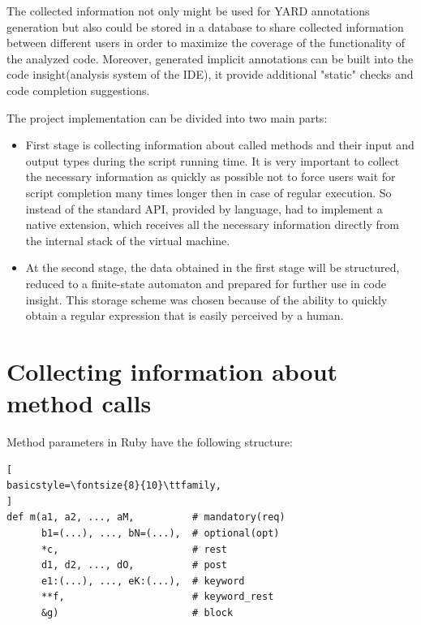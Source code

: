\documentclass[conference]{IEEEtran}
\begin{document}
The collected information not only might be used for YARD annotations generation but also could be stored in a database
to share collected information between different users in order to maximize the coverage of the functionality of the analyzed code. Moreover, generated implicit annotations can be built into the code insight(analysis system of the IDE\cite{Control_flow_analysis_in_scheme}), it provide additional "static" checks and code completion suggestions.

    The project implementation can be divided into two main parts:
    \begin{itemize}  
    \item First stage is collecting information about called methods and their input and output types during the script running time. It is very important to collect the necessary information as quickly as possible not to force users wait for script completion many times longer then in case of regular execution. So instead of the standard API, provided by language, had to implement a native extension, which receives all the necessary information directly from the internal stack of the virtual machine.

    \item At the second stage, the data obtained in the first stage will be structured, reduced to a finite-state automaton and prepared for further use in code insight. This storage scheme was chosen because of the ability to quickly obtain a regular expression that is easily perceived by a human.
    \end{itemize}

\section{Collecting information about method calls}
Method parameters in Ruby have the following structure:
\begin{lstlisting}[
basicstyle=\fontsize{8}{10}\ttfamily,
]
def m(a1, a2, ..., aM,          # mandatory(req)
      b1=(...), ..., bN=(...),  # optional(opt)
      *c,                       # rest
      d1, d2, ..., dO,          # post
      e1:(...), ..., eK:(...),  # keyword
      **f,                      # keyword_rest
      &g)                       # block
\end{lstlisting}
\end{document}
